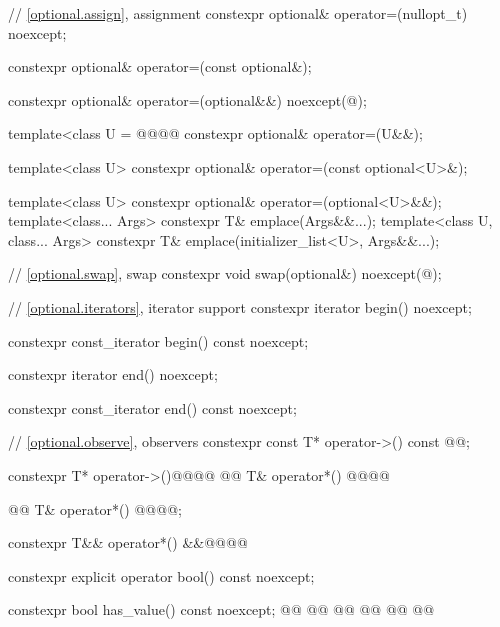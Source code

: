 \begin{codeblock}
{{    // \ref{optional.assign}, assignment
    constexpr optional& operator=(nullopt_t) noexcept;

    constexpr optional& operator=(const optional&);

    constexpr optional& operator=(optional&&) noexcept(@\seebelow@);

    template<class U = @@@@ constexpr optional& operator=(U&&);

    template<class U> constexpr optional& operator=(const optional<U>&);

    template<class U> constexpr optional& operator=(optional<U>&&);
    template<class... Args> constexpr T& emplace(Args&&...);
    template<class U, class... Args>
    constexpr T& emplace(initializer_list<U>, Args&&...);

    // \ref{optional.swap}, swap
    constexpr void swap(optional&) noexcept(@\seebelow@);

    // \ref{optional.iterators}, iterator support
    constexpr iterator begin() noexcept;

    constexpr const_iterator begin() const noexcept;

    constexpr iterator end() noexcept;

    constexpr const_iterator end() const noexcept;

    // \ref{optional.observe}, observers
    constexpr const T* operator->() const @@;

    constexpr T* operator->()@@@\added{;}@
    @@ T& operator*() @@@\added{\&;}@

    @@ T& operator*() @@@@;

    constexpr T&& operator*() &&@@@\added{;}@

    constexpr explicit operator bool() const noexcept;

    constexpr bool has_value() const noexcept;
    @@
    @@
    @@
    @@
    @@
    @@

}}
\end{codeblock}
